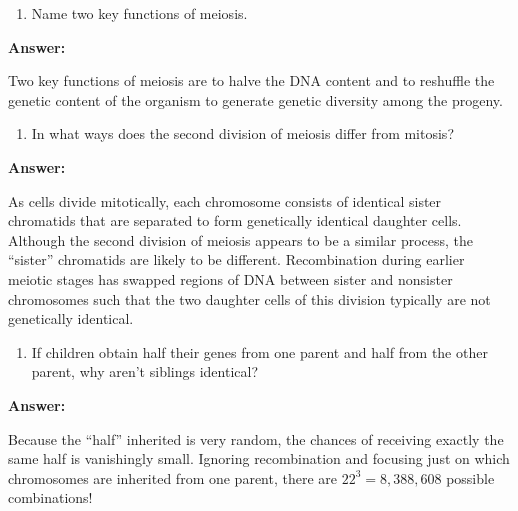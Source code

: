 \documentclass[11pt,]{article}
\providecommand{\tightlist}{%
  \setlength{\itemsep}{0pt}\setlength{\parskip}{0pt}}
\begin{document}
\begin{blackbox}

\begin{enumerate}
\def\labelenumi{\arabic{enumi}.}
\setcounter{enumi}{18}
\tightlist
\item
  Name two key functions of meiosis.
\end{enumerate}

\textbf{Answer:}

Two key functions of meiosis are to halve the DNA content and to
reshuffle the genetic content of the organism to generate genetic
diversity among the progeny.

\end{blackbox}

\begin{blackbox}

\begin{enumerate}
\def\labelenumi{\arabic{enumi}.}
\setcounter{enumi}{21}
\tightlist
\item
  In what ways does the second division of meiosis differ from mitosis?
\end{enumerate}

\textbf{Answer:}

As cells divide mitotically, each chromosome consists of identical
sister chromatids that are separated to form genetically identical
daughter cells. Although the second division of meiosis appears to be a
similar process, the ``sister'' chromatids are likely to be different.
Recombination during earlier meiotic stages has swapped regions of DNA
between sister and nonsister chromosomes such that the two daughter
cells of this division typically are not genetically identical.

\end{blackbox}

\begin{blackbox}

\begin{enumerate}
\def\labelenumi{\arabic{enumi}.}
\setcounter{enumi}{26}
\tightlist
\item
  If children obtain half their genes from one parent and half from the
  other parent, why aren't siblings identical?
\end{enumerate}

\textbf{Answer:}

Because the ``half'' inherited is very random, the chances of receiving
exactly the same half is vanishingly small. Ignoring recombination and
focusing just on which chromosomes are inherited from one parent, there
are \(22^3 = 8,388,608\) possible combinations!

\end{blackbox}
\end{document}
